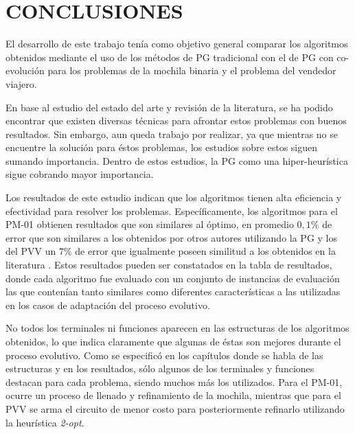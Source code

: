 
\chapter{CONCLUSIONES}
\label{cap:conclusiones}


El desarrollo de este trabajo tenía como objetivo general comparar los algoritmos obtenidos mediante el uso de los métodos de PG tradicional con el de PG con co-evolución para los problemas de la mochila binaria y el problema del vendedor viajero.

En base al estudio del estado del arte y revisión de la literatura, se ha podido encontrar que existen diversas técnicas para afrontar estos problemas con buenos resultados. Sin embargo, aun queda trabajo por realizar, ya que mientras no se encuentre la solución para éstos problemas, los estudios sobre estos siguen sumando importancia. Dentro de estos estudios, la PG como una hiper-heurística sigue cobrando mayor importancia.

Los resultados de este estudio indican que los algoritmos tienen alta eficiencia y efectividad para resolver los problemas. Específicamente, los algoritmos para el PM-01 obtienen resultados que son similares al óptimo, en promedio $0,1\%$ de error que son similares a los obtenidos por otros autores utilizando la PG \citep{sepulveda_2011, parada_2015} y los del PVV un $7\%$ de error que igualmente poseen similitud a los obtenidos en la literatura \citep{sepulveda_2011}. Estos resultados pueden ser constatados en la tabla de resultados, donde cada algoritmo fue evaluado con un conjunto de instancias de evaluación las que contenían tanto similares como diferentes características a las utilizadas en los casos de adaptación del proceso evolutivo.

No todos los terminales ni funciones aparecen en las estructuras de los algoritmos obtenidos, lo que indica claramente que algunas de éstas son mejores durante el proceso evolutivo. Como se especificó en los capítulos donde se habla de las estructuras y en los resultados, sólo algunos de los terminales y funciones destacan para cada problema, siendo muchos más los utilizados. Para el PM-01, ocurre un proceso de llenado y refinamiento de la mochila, mientras que para el PVV se arma el circuito de menor costo para posteriormente refinarlo utilizando la heurística \textit{2-opt}.

